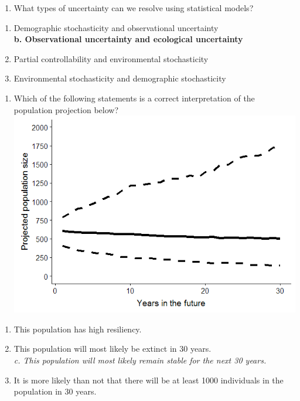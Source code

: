 \documentclass[]{article}
\providecommand{\tightlist}{%
  \setlength{\itemsep}{0pt}\setlength{\parskip}{0pt}}
\begin{document}
\begin{enumerate}
\def\labelenumi{\arabic{enumi}.}
\setcounter{enumi}{2}
\tightlist
\item
  What types of uncertainty can we resolve using statistical models?\\
\end{enumerate}

\begin{enumerate}
\def\labelenumi{\alph{enumi}.}
\tightlist
\item
  Demographic stochasticity and observational uncertainty\\
  \textbf{b. Observational uncertainty and ecological uncertainty}\\
\item
  Partial controllability and environmental stochasticity\\
\item
  Environmental stochasticity and demographic stochasticity
\end{enumerate}

\begin{enumerate}
\def\labelenumi{\arabic{enumi}.}
\setcounter{enumi}{3}
\tightlist
\item
  Which of the following statements is a correct interpretation of the
  population projection below?\\
  \includegraphics{img/pop-trend.png}
\end{enumerate}

\begin{enumerate}
\def\labelenumi{\alph{enumi}.}
\tightlist
\item
  This population has high resiliency.\\
\item
  This population will most likely be extinct in 30 years.\\
  \emph{c. This population will most likely remain stable for the next
  30 years.}\\
\item
  It is more likely than not that there will be at least 1000
  individuals in the population in 30 years.
\end{enumerate}
\end{document}
